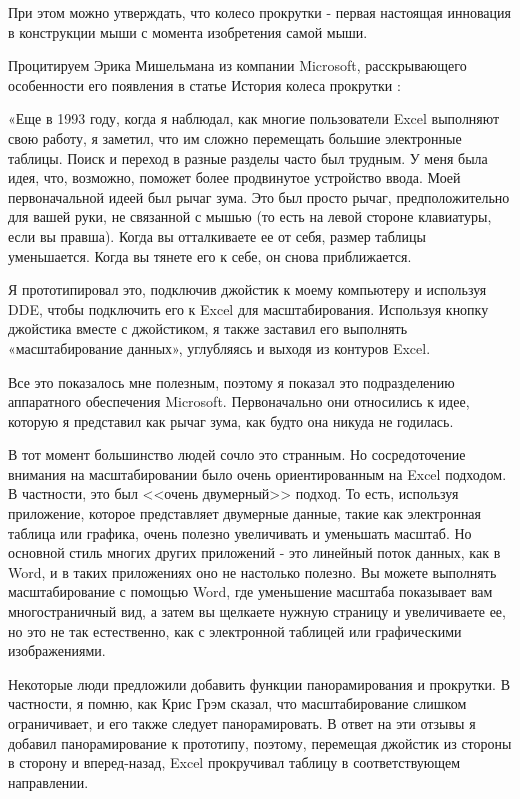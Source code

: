 \documentclass[11pt, a4paper]{article}
\begin{document}
    При этом можно утверждать, что колесо прокрутки - первая настоящая инновация в конструкции мыши с момента изобретения самой мыши.

    Процитируем Эрика Мишельмана из компании Microsoft, расскрывающего особенности его появления в статье История колеса прокрутки \cite{ink}:

    «Еще в 1993 году, когда я наблюдал, как многие пользователи Excel выполняют свою работу, я заметил, что им сложно перемещать большие электронные таблицы. Поиск и переход в разные разделы часто был трудным. У меня была идея, что, возможно, поможет более продвинутое устройство ввода.
    Моей первоначальной идеей был рычаг зума. Это был просто рычаг, предположительно для вашей руки, не связанной с мышью (то есть на левой стороне клавиатуры, если вы правша). Когда вы отталкиваете ее от себя, размер таблицы уменьшается. Когда вы тянете его к себе, он снова приближается.

    Я прототипировал это, подключив джойстик к моему компьютеру и используя DDE, чтобы подключить его к Excel для масштабирования. Используя кнопку джойстика вместе с джойстиком, я также заставил его выполнять «масштабирование данных», углубляясь и выходя из контуров Excel.

    Все это показалось мне полезным, поэтому я показал это подразделению аппаратного обеспечения Microsoft. Первоначально они относились к идее, которую я представил как рычаг зума, как будто она никуда не годилась.

\newpage

    В тот момент большинство людей сочло это странным. Но сосредоточение внимания на масштабировании было очень ориентированным на Excel подходом. В частности, это был <<очень двумерный>> подход. То есть, используя приложение, которое представляет двумерные данные, такие как электронная таблица или графика, очень полезно увеличивать и уменьшать масштаб. Но основной стиль многих других приложений - это линейный поток данных, как в Word, и в таких приложениях оно не настолько полезно. Вы можете выполнять масштабирование с помощью Word, где уменьшение масштаба показывает вам многостраничный вид, а затем вы щелкаете нужную страницу и увеличиваете ее, но это не так естественно, как с электронной таблицей или графическими изображениями.
    
    Некоторые люди предложили добавить функции панорамирования и прокрутки. В частности, я помню, как Крис Грэм сказал, что масштабирование слишком ограничивает, и его также следует панорамировать. В ответ на эти отзывы я добавил панорамирование к прототипу, поэтому, перемещая джойстик из стороны в сторону и вперед-назад, Excel прокручивал таблицу в соответствующем направлении.
\end{document}
